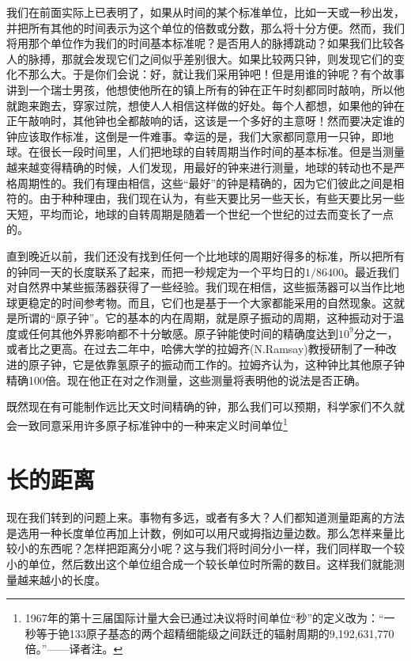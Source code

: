 我们在前面实际上已表明了，如果从时间的某个标准单位，比如一天或一秒出发，并把所有其他的时间表示为这个单位的倍数或分数，那么将十分方便。然而，我们将用那个单位作为我们的时间基本标准呢？是否用人的脉搏跳动？如果我们比较各人的脉搏，那就会发现它们之间似乎差别很大。如果比较两只钟，则发现它们的变化不那么大。于是你们会说：好，就让我们采用钟吧！但是用谁的钟呢？有个故事讲到一个瑞士男孩，他想使他所在的镇上所有的钟在正午时刻都同时敲响，所以他就跑来跑去，穿家过院，想使人人相信这样做的好处。每个人都想，如果他的钟在正午敲响时，其他钟也全都敲响的话，这该是一个多好的主意呀！然而要决定谁的钟应该取作标准，这倒是一件难事。幸运的是，我们大家都同意用一只钟，即地球。在很长一段时间里，人们把地球的自转周期当作时间的基本标准。但是当测量越来越变得精确的时候，人们发现，用最好的钟来进行测量，地球的转动也不是严格周期性的。我们有理由相信，这些“最好”的钟是精确的，因为它们彼此之间是相符的。由于种种理由，我们现在认为，有些天要比另一些天长，有些天要比另一些天短，平均而论，地球的自转周期是随着一个世纪一个世纪的过去而变长了一点的。

直到晚近以前，我们还没有找到任何一个比地球的周期好得多的标准，所以把所有的钟同一天的长度联系了起来，而把一秒规定为一个平均日的$  1/86400$。最近我们对自然界中某些振荡器获得了一些经验。我们现在相信，这些振荡器可以当作比地球更稳定的时间参考物。而且，它们也是基于一个大家都能采用的自然现象。这就是所谓的“原子钟”。它的基本的内在周期，就是原子振动的周期，这种振动对于温度或任何其他外界影响都不十分敏感。原子钟能使时间的精确度达到$ 10^9 $分之一，或者比之更高。在过去二年中，哈佛大学的拉姆齐(N.Ramsay)教授研制了一种改进的原子钟，它是依靠氢原子的振动而工作的。拉姆齐认为，这种钟比其他原子钟精确100倍。现在他正在对之作测量，这些测量将表明他的说法是否正确。

既然现在有可能制作远比天文时间精确的钟，那么我们可以预期，科学家们不久就会一致同意采用许多原子标准钟中的一种来定义时间单位\footnote{1967年的第十三届国际计量大会已通过决议将时间单位“秒”的定义改为：“一秒等于铯133原子基态的两个超精细能级之间跃迁的辐射周期的9,192,631,770倍。”——译者注。}



\section{长的距离}
现在我们转到的问题上来。事物有多远，或者有多大？人们都知道测量距离的方法是选用一种长度单位再加上计数，例如可以用尺或拇指边量边数。那么怎样来量比较小的东西呢？怎样把距离分小呢？这与我们将时间分小一样，我们同样取一个较小的单位，然后数出这个单位组合成一个较长单位时所需的数目。这样我们就能测量越来越小的长度。

